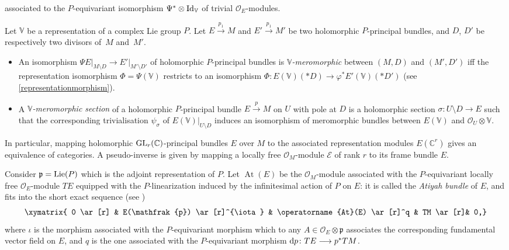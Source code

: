 \documentclass[10pt,a4paper]{amsart}
\numberwithin{equation}{section}
\begin{document}
 associated to the $P$-equivariant isomorphism $\Psi^* \otimes {\rm Id}_{\mathbb{V}}$ of trivial $\mathcal{O}_E$-modules.
\begin{Definition}\label{meromorphicisoprincipal}
Let $\mathbb{V}$ be a representation of a complex Lie group $P$. Let $E\overset{p_1}{\longrightarrow} M$ and $E'\overset{p_1}{\longrightarrow} M'$ be two holomorphic $P$-principal bundles, and $D$, $D'$ be respectively two divisors of~$M$ and~$M'$.
\begin{itemize}\itemsep=0pt
\item[$(1)$] An isomorphism $\Psi E\vert_{M\setminus D} \longrightarrow E'\vert_{M'\setminus D'}$ of holomorphic $P$-principal bundles is \textit{$\mathbb{V}$-mero\-mor\-phic} between $(M,D)$ and $(M',D')$ iff the representation isomorphism $\Phi=\Psi(\mathbb{V})$ restricts to an isomorphism $\Phi\colon E(\mathbb{V})(* D) \longrightarrow \varphi^* E'(\mathbb{V})(* D')$ (see \eqref{representationmorphism}).
\item[$(2)$] A \textit{$\mathbb{V}$-meromorphic section} of a holomorphic $P$-principal bundle $E\overset{p}{\longrightarrow} M$ on $U$ with pole at $D$ is a holomorphic section $\sigma\colon U\setminus D \longrightarrow E$ such that the corresponding trivialisation $\psi_\sigma$ of $E(\mathbb{V})\vert_{U\setminus D}$ induces an isomorphism of meromorphic bundles between $E(\mathbb{V})$ and $\mathcal{O}_U \otimes \mathbb{V}$.
 \end{itemize} \end{Definition}
In particular, mapping holomorphic ${\rm GL}_r(\mathbb{C})$-principal bundles $E$ over $M$ to the associated representation modules $E(\mathbb{C}^r)$ gives an equivalence of categories. A pseudo-inverse is given by mapping a locally free $\mathcal{O}_M$-module $\mathcal{E}$ of rank $r$ to its frame bundle $E$.

Consider $\mathfrak{p}={\rm Lie}(P)$ which is the adjoint representation of $P$. Let $\operatorname{At}(E)$ be the $\mathcal{O}_M$-module associated with the $P$-equivariant locally free $\mathcal{O}_E$-module $TE$ equipped with the $P$-linearization induced by the infinitesimal action of $P$ on $E$: it is called the \textit{Atiyah bundle} of $E$, and fits into the short exact sequence (see \cite[Theorem 1]{Atiyah})
\begin{gather}\label{Atiyah} \xymatrix{ 0 \ar[r] & E(\mathfrak{p}) \ar[r]^{\iota} & \operatorname{At}(E) \ar[r]^q & TM \ar[r]& 0,} \end{gather}
 where $\iota$ is the morphism associated with the $P$-equivariant morphism which to any $A \in \mathcal{O}_E \otimes \mathfrak{p}$ associates the corresponding fundamental vector field on $E$, and $q$ is the one associated with the $P$-equivariant morphism ${\rm d}p\colon TE \longrightarrow p^*TM$.
\end{document}
